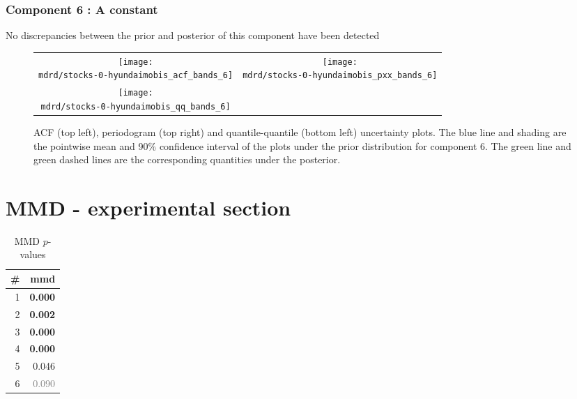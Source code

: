 \documentclass{article} %
\begin{document}
\subsubsection{Component 6 : A constant}

No discrepancies between the prior and posterior of this component have been detected

\begin{figure}[H]
\newcommand{\wmgd}{0.5\columnwidth}
\newcommand{\hmgd}{3.0cm}
\newcommand{\mdrd}{stocks-0-hyundaimobis}
\newcommand{\mbm}{\hspace{-0.3cm}}
\begin{tabular}{cc}
\mbm \texttt{[image: \\mdrd/stocks-0-hyundaimobis\_acf\_bands\_6]} & \texttt{[image: \\mdrd/stocks-0-hyundaimobis\_pxx\_bands\_6]} \\
\mbm \texttt{[image: \\mdrd/stocks-0-hyundaimobis\_qq\_bands\_6]}
\end{tabular}
\caption{
ACF (top left), periodogram (top right) and quantile-quantile (bottom left) uncertainty plots.
The blue line and shading are the pointwise mean and 90\% confidence interval of the plots under the prior distribution for component 6.
The green line and green dashed lines are the corresponding quantities under the posterior.}
\label{fig:check6}
\end{figure}

\section{MMD - experimental section}
\label{sec:mmd}

\begin{table}[htb]
\begin{center}
{\small
\begin{tabular}{|r|r|}
\hline
\bf{\#} & {mmd}\\
\hline

1 & \textbf{0.000}\\

2 & \textbf{0.002}\\

3 & \textbf{0.000}\\

4 & \textbf{0.000}\\

5 & 0.046\\

6 & \textcolor{gray}{0.090}\\

\hline
\end{tabular}
\caption{
MMD $p$-values
}
\label{table:mmd}
}
\end{center}
\end{table}
\end{document}
